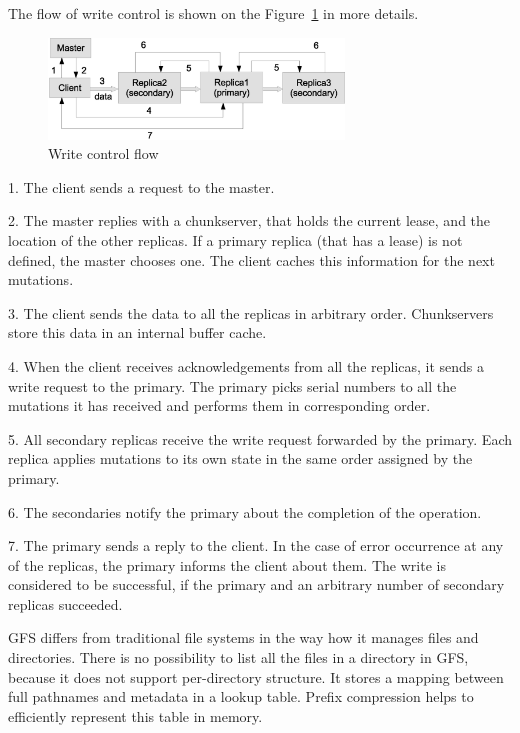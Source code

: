 The flow of write control is shown on the Figure~\ref{fig:write_control_flow} in
more details.

\begin{figure}
  \centering
  \includegraphics [width=0.7\textwidth]{images/write_control_flow}
  \caption{Write control flow}
  \label{fig:write_control_flow}
\end{figure}

1. The client sends a request to the master.

2. The master replies with a chunkserver, that holds the current lease, and the location of the other replicas.
If a primary replica (that has a lease) is not defined, the master chooses one. 
The client caches this information for the next mutations.

3. The client sends the data to all the replicas in arbitrary order.
Chunkservers store this data in an internal buffer cache. 

4. When the client receives acknowledgements from all the replicas, it sends a write request to the primary.
The primary picks serial numbers to all the mutations it has received and performs them in corresponding order.

5. All secondary replicas receive the write request forwarded by the primary.
Each replica applies mutations to its own state in the same order assigned by the primary.

6. The secondaries notify the primary about the completion of the operation.

7. The primary sends a reply to the client.
In the case of error occurrence at any of the replicas, the primary informs the client about them.
The write is considered to be successful, if the primary and an arbitrary number of secondary replicas succeeded.

GFS differs from traditional file systems in the way how it manages files and directories.
There is no possibility to list all the files in a directory in GFS, because it does not support per-directory structure.
It stores a mapping between full pathnames and metadata in a lookup table.
Prefix compression helps to efficiently represent this table in memory. 

